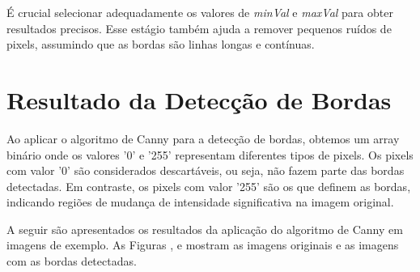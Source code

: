 
É crucial selecionar adequadamente os valores de \textit{minVal} e \textit{maxVal} para obter resultados precisos. Esse estágio também ajuda a remover pequenos ruídos de pixels, assumindo que as bordas são linhas longas e contínuas.

\section{Resultado da Detecção de Bordas}
\label{sec:resultado-deteccao-bordas}

Ao aplicar o algoritmo de Canny para a detecção de bordas, obtemos um array binário onde os valores '0' e '255' representam diferentes tipos de pixels. Os pixels com valor '0' são considerados descartáveis, ou seja, não fazem parte das bordas detectadas. Em contraste, os pixels com valor '255' são os que definem as bordas, indicando regiões de mudança de intensidade significativa na imagem original.

A seguir são apresentados os resultados da aplicação do algoritmo de Canny em imagens de exemplo. As Figuras ,  e mostram as imagens originais e as imagens com as bordas detectadas.



